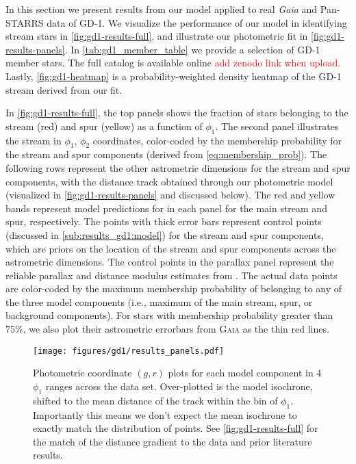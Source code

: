\documentclass[twocolumn]{aastex631}
\newcommand{\code}[1]{\textsc{#1}}
\newcommand{\package}[1]{\code{#1}}
\newcommand{\stream}[1]{#1}
\newcommand{\TODO}[1]{{\textcolor{red}{#1}}}
\begin{document}
        In this section we present results from our model applied to real {\it
        Gaia} and Pan-STARRS data of \stream{GD-1}.  We visualize the
        performance of our model in identifying stream stars in
        \autoref{fig:gd1-results-full}, and illustrate our photometric fit in
        \autoref{fig:gd1-results-panels}. In \autoref{tab:gd1_member_table} we
        provide a selection of \stream{GD-1} member stars. The full catalog is
        available online \TODO{add zenodo link when upload}. Lastly,
        \autoref{fig:gd1-heatmap} is a probability-weighted density heatmap of
        the \stream{GD-1} stream derived from our fit.

        In \autoref{fig:gd1-results-full}, the top panels shows the fraction of
        stars belonging to the stream (red) and spur (yellow) as a function of
        $\phi_1$. The second panel illustrates the stream in $\phi_1$, $\phi_2$
        coordinates, color-coded by the membership probability for the stream
        and spur components (derived from \autoref{eq:membership_prob}). The
        following rows represent the other astrometric dimensions for the stream
        and spur components, with the distance track obtained through our
        photometric model (visualized in \autoref{fig:gd1-results-panels} and
        discussed below). The red and yellow bands represent model predictions
        for in each panel for the main stream and spur, respectively. The points
        with thick error bars represent control points (discussed in
        \autoref{sub:results_gd1:model}) for the stream and spur components,
        which are priors on the location of the stream and spur components
        across the astrometric dimensions. The control points in the parallax
        panel represent the reliable parallax and distance modulus estimates
        from \citet{deBoer+2020}. The actual data points are color-coded by the
        maximum membership probability of belonging to any of the three model
        components (i.e., maximum of the main stream, spur, or background
        components). For stars with membership probability greater than $75\%$,
        we also plot their astrometric errorbars from \package{Gaia} as the thin
        red lines.

        \begin{figure*}[t]
            \centering
            \texttt{[image: figures/gd1/results\_panels.pdf]}
            \caption{%
                Photometric coordinate $(g, r)$ plots for each model component
                in 4 $\phi_1$ ranges across the data set. Over-plotted is the
                model isochrone, shifted to the mean distance of the track
                within the bin of $\phi_1$. Importantly this means we don't
                expect the mean isochrone to exactly match the distribution of
                points. See \autoref{fig:gd1-results-full} for the match of the
                distance gradient to the data and prior literature results.
            }
            \label{fig:gd1-results-panels}
        \end{figure*}
\end{document}
